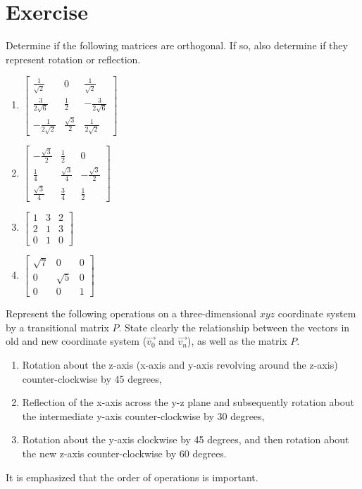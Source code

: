 \section{Exercise}

\begin{Exercise}
Determine if the following matrices are orthogonal. If so, also determine if they represent rotation or reflection.
\begin{enumerate}[label=(\alph*)]
\item $\begin{bmatrix}
\frac{1}{\sqrt{2}} & 0 & \frac{1}{\sqrt{2}}\\
\frac{3}{2\sqrt{6}} & \frac{1}{2} & -\frac{3}{2\sqrt{6}}\\
-\frac{1}{2\sqrt{2}} & \frac{\sqrt{3}}{2} & \frac{1}{2\sqrt{2}}
\end{bmatrix}$
\item $\begin{bmatrix}
-\frac{\sqrt{3}}{2} & \frac{1}{2} & 0\\
\frac{1}{4} & \frac{\sqrt{3}}{4} & -\frac{\sqrt{3}}{2}\\
\frac{\sqrt{3}}{4} & \frac{3}{4} & \frac{1}{2}
\end{bmatrix}$
\item $\begin{bmatrix}
1 & 3 & 2\\
2 & 1 & 3\\
0 & 1 & 0
\end{bmatrix}$
\item $\begin{bmatrix}
\sqrt{7} & 0 & 0\\
0 & \sqrt{5} & 0\\
0 & 0 & 1
\end{bmatrix}$
\end{enumerate}
\end{Exercise}

\begin{Exercise}
Represent the following operations on a three-dimensional $xyz$ coordinate system by a transitional matrix $P$. State clearly the relationship between the vectors in old and new coordinate system ($\vec{v_0}$ and $\vec{v_n}$), as well as the matrix $P$.
\begin{enumerate}[label=(\alph*)]
\item Rotation about the z-axis (x-axis and y-axis revolving around the z-axis) counter-clockwise by 45 degrees,
\item Reflection of the x-axis across the y-z plane and subsequently rotation about the intermediate y-axis counter-clockwise by 30 degrees,
\item Rotation about the y-axis clockwise by 45 degrees, and then rotation about the new z-axis counter-clockwise by 60 degrees.
\end{enumerate}
It is emphasized that the order of operations is important.
\end{Exercise}

